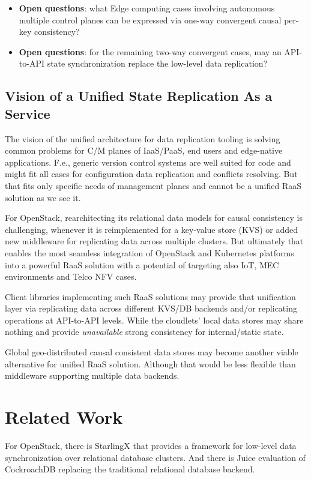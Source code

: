 \documentclass[conference]{IEEEtran}
\begin{document}
\begin{itemize}
  \item \textbf{Open questions}: what Edge computing cases involving autonomous
    multiple control planes can be expressed via one-way convergent causal
    per-key consistency?
\item \textbf{Open questions}: for the remaining two-way convergent cases,
    may an API-to-API state synchronization replace the low-level data
    replication?
\end{itemize}

\subsection{Vision of a Unified State Replication As a Service}
The vision of the unified architecture for data replication tooling is solving
common problems for C/M planes of IaaS/PaaS, end users and edge-native
applications. F.e., generic version control systems are well suited for code
and might fit all cases for configuration data replication and conflicts
resolving. But that fits only specific needs of management planes and cannot be
a unified RaaS solution as we see it.

For OpenStack, rearchitecting its relational data models for causal consistency
is challenging, whenever it is reimplemented for a key-value store (KVS) or
added new middleware for replicating data across multiple clusters. But
ultimately that enables the most seamless integration of OpenStack and
Kubernetes platforms into a powerful RaaS solution with a potential of
targeting also IoT, MEC environments and Telco NFV cases.

Client libraries implementing such RaaS solutions may provide that unification
layer via replicating data across different KVS/DB backends and/or replicating
operations at API-to-API levels. While the cloudlets' local data stores may
share nothing and provide \textit{unavailable}\cite{b4} strong consistency for
internal/static state.

Global geo-distributed causal consistent data stores may become another viable
alternative for unified RaaS solution. Although that would be less flexible
than middleware supporting multiple data backends.

\section{Related Work}
For OpenStack, there is StarlingX\cite{b24} that provides a framework for
low-level data synchronization over relational database clusters. And there is
Juice\cite{b21} evaluation of CockroachDB\cite{b22} replacing the traditional
relational database backend.
\end{document}
